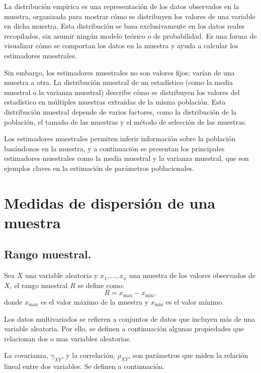 \documentclass[
  us-letterpaper,
]{scrreprt}
\theoremstyle{plain}
\theoremstyle{definition}
\theoremstyle{definition}
\theoremstyle{remark}
\begin{document}
La distribución empírica es una representación de los datos observados
en la muestra, organizada para mostrar cómo se distribuyen los valores
de una variable en dicha muestra. Esta distribución se basa
exclusivamente en los datos reales recopilados, sin asumir ningún modelo
teórico o de probabilidad. Es una forma de visualizar cómo se comportan
los datos en la muestra y ayuda a calcular los estimadores muestrales.

Sin embargo, los estimadores muestrales no son valores fijos; varían de
una muestra a otra. La distribución muestral de un estadístico (como la
media muestral o la varianza muestral) describe cómo se distribuyen los
valores del estadístico en múltiples muestras extraídas de la misma
población. Esta distribución muestral depende de varios factores, como
la distribución de la población, el tamaño de las muestras y el método
de selección de las muestras.

Los estimadores muestrales permiten inferir información sobre la
población basándonos en la muestra, y a continuación se presentan los
principales estimadores muestrales como la media muestral y la varianza
muestral, que son ejemplos claves en la estimación de parámetros
poblacionales.

\section{Medidas de dispersión de una
muestra}\label{medidas-de-dispersiuxf3n-de-una-muestra}

\subsection{Rango muestral.}\label{rango-muestral.}

Sea \(X\) una variable aleatoria y \(x_1 , \dots , x_n\) una muestra de
los valores observados de \(X\), el rango muestral \(R\) se define como:
\[
R = x_\mathrm{max} - x_\mathrm{min},
\] donde \(x_\mathrm{max}\) es el valor máximo de la muestra y
\(x_\mathrm{min}\) es el valor mínimo.

Los datos multivariados se refieren a conjuntos de datos que incluyen
más de una variable aleatoria. Por ello, se definen a continuación
algunas propiedades que relacionan dos o mas variables aleatorias.

La covarianza, \(\gamma_{XY}\), y la correlación, \(\rho_{XY}\), son
parámetros que miden la relación lineal entre dos variables. Se definen
a continuación.
\end{document}
